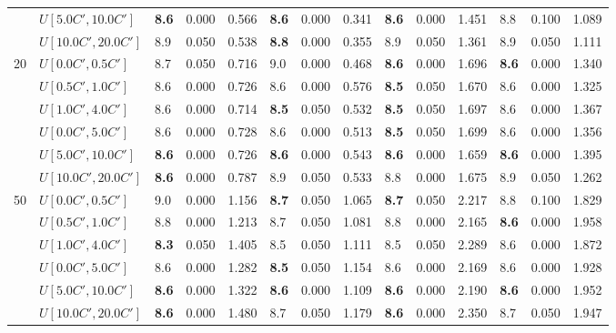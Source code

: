 \begin{table}[h]
{\begin{tabular}{|l|l||l|l|l||l|l|l||l|l|l||l|l|l|}
       & $U[5.0C',10.0C']$ & \textbf{8.6} & 0.000 & 0.566 & \textbf{8.6} & 0.000 & 0.341 & \textbf{8.6} & 0.000 & 1.451 & 8.8 & 0.100 & 1.089 \\
       & $U[10.0C',20.0C']$ & 8.9 & 0.050 & 0.538 & \textbf{8.8} & 0.000 & 0.355 & 8.9 & 0.050 & 1.361 & 8.9 & 0.050 & 1.111 \\
      \hline\hline
      \multirow{6}{*}{20} & $U[0.0C',0.5C']$ & 8.7 & 0.050 & 0.716 & 9.0 & 0.000 & 0.468 & \textbf{8.6} & 0.000 & 1.696 & \textbf{8.6} & 0.000 & 1.340 \\
       & $U[0.5C',1.0C']$ & 8.6 & 0.000 & 0.726 & 8.6 & 0.000 & 0.576 & \textbf{8.5} & 0.050 & 1.670 & 8.6 & 0.000 & 1.325 \\
       & $U[1.0C',4.0C']$ & 8.6 & 0.000 & 0.714 & \textbf{8.5} & 0.050 & 0.532 & \textbf{8.5} & 0.050 & 1.697 & 8.6 & 0.000 & 1.367 \\
       & $U[0.0C',5.0C']$ & 8.6 & 0.000 & 0.728 & 8.6 & 0.000 & 0.513 & \textbf{8.5} & 0.050 & 1.699 & 8.6 & 0.000 & 1.356 \\
       & $U[5.0C',10.0C']$ & \textbf{8.6} & 0.000 & 0.726 & \textbf{8.6} & 0.000 & 0.543 & \textbf{8.6} & 0.000 & 1.659 & \textbf{8.6} & 0.000 & 1.395 \\
       & $U[10.0C',20.0C']$ & \textbf{8.6} & 0.000 & 0.787 & 8.9 & 0.050 & 0.533 & 8.8 & 0.000 & 1.675 & 8.9 & 0.050 & 1.262 \\
      \hline\hline
      \multirow{6}{*}{50} & $U[0.0C',0.5C']$ & 9.0 & 0.000 & 1.156 & \textbf{8.7} & 0.050 & 1.065 & \textbf{8.7} & 0.050 & 2.217 & 8.8 & 0.100 & 1.829 \\
       & $U[0.5C',1.0C']$ & 8.8 & 0.000 & 1.213 & 8.7 & 0.050 & 1.081 & 8.8 & 0.000 & 2.165 & \textbf{8.6} & 0.000 & 1.958 \\
       & $U[1.0C',4.0C']$ & \textbf{8.3} & 0.050 & 1.405 & 8.5 & 0.050 & 1.111 & 8.5 & 0.050 & 2.289 & 8.6 & 0.000 & 1.872 \\
       & $U[0.0C',5.0C']$ & 8.6 & 0.000 & 1.282 & \textbf{8.5} & 0.050 & 1.154 & 8.6 & 0.000 & 2.169 & 8.6 & 0.000 & 1.928 \\
       & $U[5.0C',10.0C']$ & \textbf{8.6} & 0.000 & 1.322 & \textbf{8.6} & 0.000 & 1.109 & \textbf{8.6} & 0.000 & 2.190 & \textbf{8.6} & 0.000 & 1.952 \\
       & $U[10.0C',20.0C']$ & \textbf{8.6} & 0.000 & 1.480 & 8.7 & 0.050 & 1.179 & \textbf{8.6} & 0.000 & 2.350 & 8.7 & 0.050 & 1.947 \\
      \hline
      \end{tabular}
      }
      \label{tab:pcpn120ILPVariant}\end{table}


